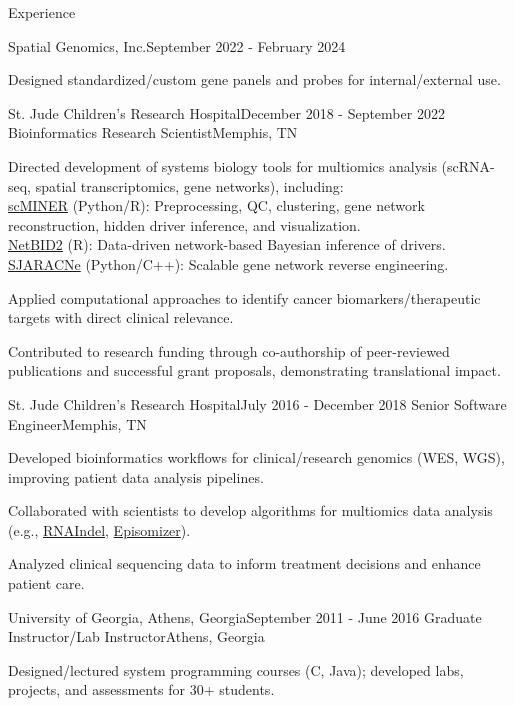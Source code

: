 \documentclass{resume} %
\begin{document}
\begin{rSection}{Experience}
\begin{rSubsection}{Spatial Genomics, Inc.}{September 2022 - February 2024}
\item Designed standardized/custom gene panels and probes for internal/external use.
\end{rSubsection}


\begin{rSubsection}{St. Jude Children's Research Hospital}{December 2018 - September 2022}
{Bioinformatics Research Scientist}{Memphis, TN}
\item Directed development of systems biology tools for multiomics analysis (scRNA-seq, spatial transcriptomics, gene networks), including:\\
\href{https://jyyulab.github.io/scMINER/}{scMINER} (Python/R): Preprocessing, QC, clustering, gene network reconstruction, hidden driver inference, and visualization.\\
\href{https://jyyulab.github.io/NetBID/}{NetBID2} (R): Data-driven network-based Bayesian inference of drivers.\\
\href{https://github.com/jyyulab/SJARACNe}{SJARACNe} (Python/C++): Scalable gene network reverse engineering.

\item Applied computational approaches to identify cancer biomarkers/therapeutic targets with direct clinical relevance.

\item Contributed to research funding through co-authorship of peer-reviewed publications and successful grant proposals, demonstrating translational impact.
\end{rSubsection}


\begin{rSubsection}{St. Jude Children's Research Hospital}{July 2016 - December 2018}
{Senior Software Engineer}{Memphis, TN}
\item Developed bioinformatics workflows for clinical/research genomics (WES, WGS), improving patient data analysis pipelines.

\item Collaborated with scientists to develop algorithms for multiomics data analysis (e.g., \href{https://github.com/stjude/RNAIndel}{RNAIndel}, \href{https://github.com/stjude/Episomizer}{Episomizer}).

\item Analyzed clinical sequencing data to inform treatment decisions and enhance patient care.
\end{rSubsection}


\begin{rSubsection}{University of Georgia, Athens, Georgia}{September 2011 - June 2016}
{Graduate Instructor/Lab Instructor}{Athens, Georgia}
\item Designed/lectured system programming courses (C, Java); developed labs, projects, and assessments for 30+ students.
\end{rSubsection}

\end{rSection}
\end{document}
